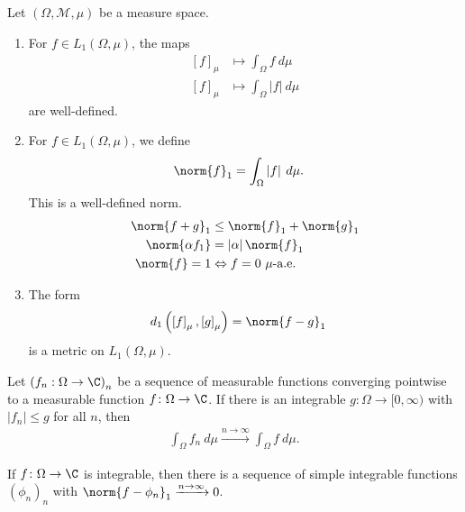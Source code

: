 \begin{fact}
  Let $\left(\Omega,\mathcal{M},\mu\right)$ be a measure space.
  \begin{enumerate}[(1)]
    \item For $f\in L_{1}\left(\Omega,\mu\right)$, the maps
      \begin{align*}
        \left[f\right]_{\mu} &\longmapsto \int_{\Omega}^{} f\:d\mu\\
        \left[f\right]_{\mu} &\longmapsto \int_{\Omega}^{} \left\vert f \right\vert\:d\mu
      \end{align*}
      are well-defined.
    \item For $f\in L_{1}\left(\Omega,\mu\right)$, we define
      \begin{align*}
        \norm{f}_{1} &= \int_{\Omega}^{} \left\vert f \right\vert\:d\mu.
      \end{align*}
      This is a well-defined norm.
      \begin{align*}
        \norm{f+g}_{1} &\leq \norm{f}_{1} + \norm{g}_{1}\\
        \norm{\alpha f_1} &= \left\vert \alpha \right\vert\norm{f}_{1}\\
        \norm{f} = 1 &\Leftrightarrow f= 0 \text{ $\mu$-a.e.}
      \end{align*}
    \item The form
      \begin{align*}
        d_1\left(\left[f\right]_{\mu},\left[g\right]_{\mu}\right) &= \norm{f-g}_{1}
      \end{align*}
      is a metric on $L_{1}\left(\Omega,\mu\right)$.
  \end{enumerate}
\end{fact}
\begin{theorem}
  Let $\left(f_n:\Omega\rightarrow \C\right)_{n}$ be a sequence of measurable functions converging pointwise to a measurable function $f\colon \Omega\rightarrow \C$. If there is an integrable $g\colon \Omega \rightarrow [0,\infty)$ with $\left\vert f_n \right\vert\leq g$ for all $n$, then
  \begin{align*}
    \int_{\Omega}^{} f_n\:d\mu \xrightarrow{n\rightarrow\infty}\int_{\Omega}^{} f\:d\mu.
  \end{align*}
\end{theorem}
\begin{corollary}
  If $f\colon \Omega\rightarrow \C$ is integrable, then there is a sequence of simple integrable functions $\left(\phi_n\right)_n$ with $\norm{f - \phi_{n}}_{1}\xrightarrow{n\rightarrow\infty}0$.
\end{corollary}
